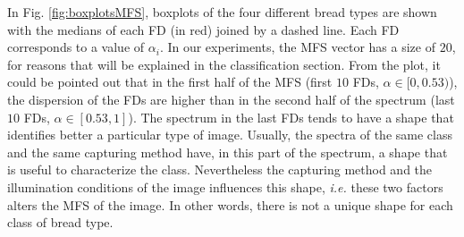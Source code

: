In Fig. \ref{fig:boxplotsMFS}, boxplots of the four different bread types are shown with the medians of each FD (in red) joined by a dashed line. Each FD corresponds to a value of $\alpha_{i}$. In our experiments, the MFS vector has a size of $20$, for reasons that will be explained in the classification section. From the plot, it could be pointed out that in the first half of the MFS (first $10$ FDs, $\alpha \in [0,0.53)$), the dispersion of the FDs are higher than in the second half of the spectrum (last $10$ FDs, $\alpha \in [0.53,1]$). The spectrum in the last FDs tends to have a shape that identifies better a particular type of image. Usually, the spectra of the same class and the same capturing method have, in this part of the spectrum, a shape that is useful to characterize the class. Nevertheless the capturing method and the illumination conditions of the image influences this shape, {\em i.e.} these two factors alters the MFS of the image. In other words, there is not a unique shape for each class of bread type.


